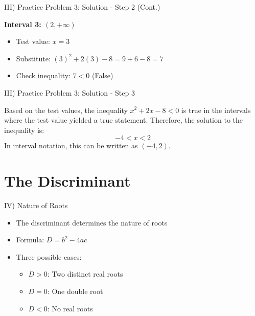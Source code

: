 \documentclass[aspectratio=169]{beamer}
\begin{document}
\begin{frame}{III) Practice Problem 3: Solution - Step 2 (Cont.)}
    \begin{tcolorbox}[colback=lightgray,colframe=accent,title=Solution: Step 2 - Use Test Values (Cont.)]
        \footnotesize
        \textbf{Interval 3: $(2, +\infty)$}
        \begin{itemize}
            \item Test value: $x=3$
            \item Substitute: $(3)^2 + 2(3) - 8 = 9 + 6 - 8 = 7$
            \item Check inequality: $7 < 0$ (False)
        \end{itemize}
    \end{tcolorbox}
\end{frame}

\begin{frame}{III) Practice Problem 3: Solution - Step 3}
    \begin{tcolorbox}[colback=lightgray,colframe=accent,title=Solution: Step 3 - State the Solution]
        \footnotesize
        Based on the test values, the inequality $x^2 + 2x - 8 < 0$ is true in the intervals where the test value yielded a true statement.
        \newline
        Therefore, the solution to the inequality is:
        \[
            -4 < x < 2
        \]
        In interval notation, this can be written as $(-4, 2)$.
    \end{tcolorbox}
\end{frame}

\section{The Discriminant}

\begin{frame}{IV) Nature of Roots}
    \begin{tcolorbox}[colback=lightgray,colframe=primary,title=Key Concept]
        \footnotesize
        \begin{itemize}
            \item The discriminant determines the nature of roots
            \item Formula: $D=b^2-4ac$
            \item Three possible cases:
            \begin{itemize}
                \item $D>0$: Two distinct real roots
                \item $D=0$: One double root
                \item $D<0$: No real roots
            \end{itemize}
        \end{itemize}
    \end{tcolorbox}
\end{frame}
\end{document}
